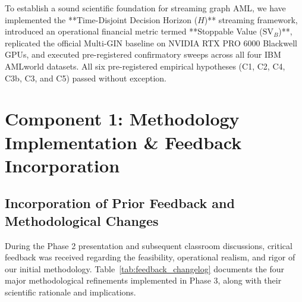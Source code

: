 \documentclass[11pt,a4paper]{article}
\begin{document}
To establish a sound scientific foundation for streaming graph AML, we have implemented the **Time-Disjoint Decision Horizon ($H$)** streaming framework, introduced an operational financial metric termed **Stoppable Value ($\text{SV}_B$)**, replicated the official Multi-GIN baseline on NVIDIA RTX PRO 6000 Blackwell GPUs, and executed pre-registered confirmatory sweeps across all four IBM AMLworld datasets. All six pre-registered empirical hypotheses (C1, C2, C4, C3b, C3, and C5) passed without exception.

\section{Component 1: Methodology Implementation \& Feedback Incorporation}
\label{sec:comp1_methodology}

\subsection{Incorporation of Prior Feedback and Methodological Changes}
During the Phase 2 presentation and subsequent classroom discussions, critical feedback was received regarding the feasibility, operational realism, and rigor of our initial methodology. Table~\ref{tab:feedback_changelog} documents the four major methodological refinements implemented in Phase 3, along with their scientific rationale and implications.
\end{document}
